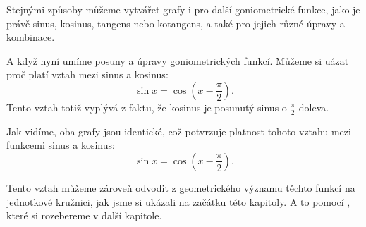 \documentclass[12pt,a4paper]{article}
\begin{document}
Stejnými způsoby můžeme vytvářet grafy i pro další goniometrické funkce, jako je právě sinus, kosinus, tangens nebo kotangens,
a také pro jejich různé úpravy a kombinace.

A když nyní umíme posuny a úpravy goniometrických funkcí. Můžeme si uázat proč platí vztah mezi sinus a kosinus:
\[\sin x = \cos\left(x - \frac{\pi}{2}\right).\]
Tento vztah totiž vyplývá z faktu, že kosinus je posunutý sinus o $\frac{\pi}{2}$ doleva.

\begin{center}

\end{center}
Jak vidíme, oba grafy jsou identické, což potvrzuje platnost tohoto vztahu mezi funkcemi sinus a kosinus:
\[
\sin x = \cos\left(x - \frac{\pi}{2}\right).
\]

Tento vztah můžeme zároveň odvodit z geometrického významu těchto funkcí na jednotkové kružnici, jak jsme si ukázali na začátku této kapitoly.
A to pomocí , které si rozebereme v další kapitole.
\end{document}
